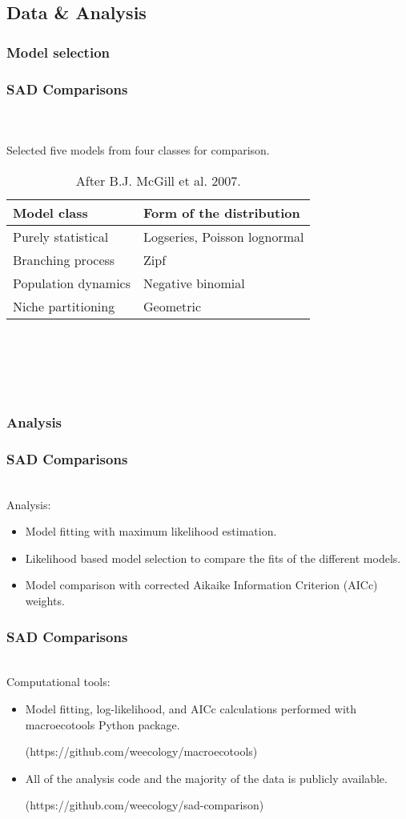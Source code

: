 \documentclass[14pt]{beamer}
\begin{document}
\subsection{Data & Analysis}
\subsubsection{Model selection}
\begin{frame}[shrink=10]
\frametitle{SAD Comparisons}
~\\
~\\
Selected five models from four classes for comparison.
\begin{table}
\begin{tabular}{l|l}
 Model class & Form of the distribution\\ 
\hline
 Purely statistical & Logseries, Poisson lognormal\\
 Branching process & Zipf \\
 Population dynamics & Negative binomial\\
 Niche partitioning & Geometric \\
\end{tabular}
~\\
~\\
~\\
~\\
\caption{After B.J. McGill et al. 2007.}
\end{table}
\end{frame}

\subsubsection{Analysis}
\begin{frame}
\frametitle{SAD Comparisons}
~\\
Analysis:
\begin{itemize}
\item Model fitting with maximum likelihood estimation. 
\item Likelihood based model selection to compare the fits of the different models.
\item Model comparison with corrected Aikaike Information Criterion (AICc) weights.
\end{itemize}
\end{frame}

\begin{frame}
\frametitle{SAD Comparisons}
~\\
Computational tools:
\begin{itemize}
\item Model fitting, log-likelihood, and AICc calculations performed with macroecotools Python package.\\
\begin{small}
(https://github.com/weecology/macroecotools)
\end{small}
\item All of the analysis code and the majority of the data is publicly available.
\begin{small}
(https://github.com/weecology/sad-comparison)
\end{small}
\end{itemize}
\end{frame}
\end{document}
